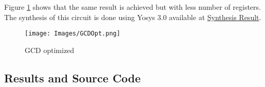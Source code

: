 Figure \ref{GCDOPT} shows that the same result is achieved but with less number of registers. The synthesis of this circuit is done using Yosys 3.0 available at 
\href{https://www.edaplayground.com/x/4reN}{Synthesis Result}.

\begin{figure}[H]
    \centering
    \texttt{[image: Images/GCDOpt.png]}
    \caption{GCD optimized}
    \label{GCDOPT}
\end{figure}

\subsection{Results and Source Code}

